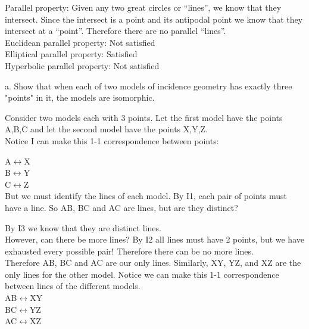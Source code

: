 \documentclass[12pt,letterpaper]{article}
\newcommand{\Proof}{\noindent {\bf Proof: }}
\newcommand{\prob}[1]{\newpage\noindent {\bf #1}}
\begin{document}
Parallel property: Given any two great circles or ``lines'', we know that they intersect.  Since the intersect is a point and its antipodal point we know that they intersect at a ``point''.  Therefore there are no parallel ``lines''.\\

Euclidean parallel property: Not satisfied\\

Elliptical parallel property: Satisfied\\

Hyperbolic parallel property: Not satisfied\\







\prob{10} 

a. Show that when each of two models of incidence geometry has exactly three "points" in it, the models are isomorphic.\\

\Proof

Consider two models each with 3 points.  Let the first model have the points A,B,C and let the second model have the points X,Y,Z.  \\

\noindent Notice I can make this 1-1 correspondence between points:

\noindent A$\leftrightarrow$X\\
B$\leftrightarrow$Y\\
C$\leftrightarrow$Z\\

But we must identify the lines of each model. By I1, each pair of points must have a line.  So AB, BC and AC are lines, but are they distinct?  

By I3 we know that they are distinct lines. \\ 

However, can there be more lines?  By I2 all lines must have 2 points, but we have exhausted every possible pair! Therefore there can be no more lines. \\

Therefore AB, BC and AC are our only lines.  Similarly, XY, YZ, and XZ are the only lines for the other model.  Notice we can make this 1-1 correspondence between lines of the different models.\\

\noindent AB$\leftrightarrow$XY\\
BC$\leftrightarrow$YZ\\
AC$\leftrightarrow$XZ\\
\end{document}
